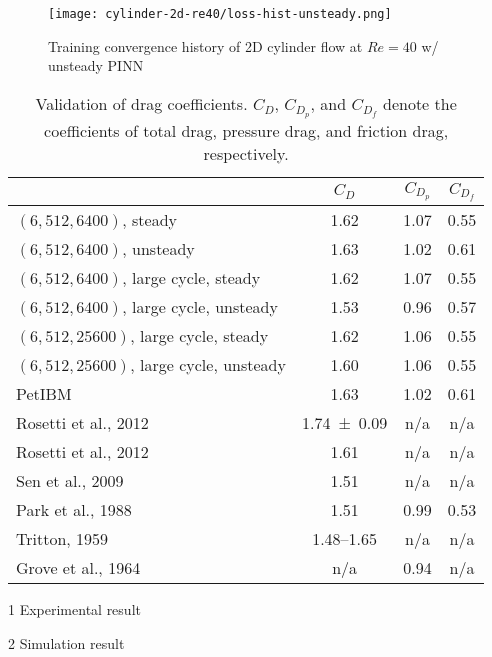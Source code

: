 \lipsum[1]

\begin{figure}[!hbt]
    \centering%
    \texttt{[image: cylinder-2d-re40/loss-hist-unsteady.png]}%
    \caption{%
        Training convergence history of 2D cylinder flow at $Re=\num{40}$ w/ unsteady PINN
    }
    \label{fig:cylinder-re40-unsteady-pinn-loss}%
\end{figure}

\lipsum[1]

\begin{table}[hbt!]
    \begin{threeparttable}[b]
        \begin{tabular}{lccc}
            \toprule
            & $C_D$ & $C_{D_p}$ & $C_{D_f}$ \\
            \midrule
            $(6, 512, 6400)$, steady & 1.62 & 1.07 & 0.55 \\
            $(6, 512, 6400)$, unsteady & 1.63 & 1.02 & 0.61 \\
            $(6, 512, 6400)$, large cycle, steady & 1.62 & 1.07 & 0.55 \\
            $(6, 512, 6400)$, large cycle, unsteady & 1.53 & 0.96 & 0.57 \\
            $(6, 512, 25600)$, large cycle, steady & 1.62 & 1.06 & 0.55 \\
            $(6, 512, 25600)$, large cycle, unsteady & 1.60 & 1.06 & 0.55 \\
            PetIBM & 1.63 & 1.02 & 0.61 \\
            Rosetti et al., 2012\cite{rosetti_urans_2012}\tnote{1} & \num{1.74+-0.09} & n/a & n/a \\
            Rosetti et al., 2012\cite{rosetti_urans_2012}\tnote{2} & 1.61 & n/a & n/a \\
            Sen et al., 2009\cite{sen_steady_2009}\tnote{2} & 1.51 & n/a & n/a \\
            Park et al., 1988\cite{park_numerical_1998}\tnote{2} & 1.51 & 0.99 & 0.53 \\
            Tritton, 1959\cite{tritton_experiments_1959}\tnote{1} & 1.48--1.65 & n/a & n/a \\
            Grove et al., 1964\cite{grove_experimental_1964}\tnote{1} & n/a & 0.94 & n/a \\
            \bottomrule
        \end{tabular}%
        \begin{tablenotes}
            \footnotesize
            \item [1] Experimental result
            \item [2] Simulation result
        \end{tablenotes}
        \caption{%
            Validation of drag coefficients.%
            $C_D$, $C_{D_p}$, and $C_{D_f}$ denote the coefficients of total drag, pressure drag, %
            and friction drag, respectively.%
        }%
        \label{table:cylinder-re40-cd-comparison}
    \end{threeparttable}
\end{table}%

